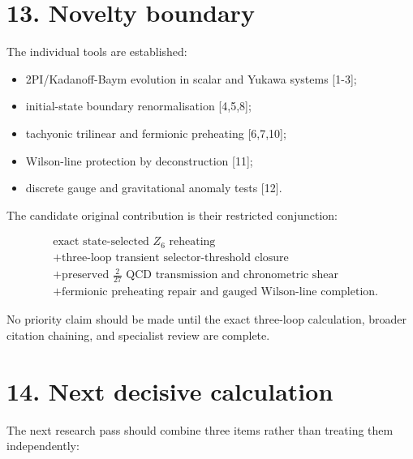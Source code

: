 \documentclass[
  10pt,
]{article}
\providecommand{\tightlist}{%
  \setlength{\itemsep}{0pt}\setlength{\parskip}{0pt}}
\begin{document}
\section{13. Novelty boundary}\label{novelty-boundary}

The individual tools are established:

\begin{itemize}
\tightlist
\item
  2PI/Kadanoff-Baym evolution in scalar and Yukawa systems {[}1-3{]};
\item
  initial-state boundary renormalisation {[}4,5,8{]};
\item
  tachyonic trilinear and fermionic preheating {[}6,7,10{]};
\item
  Wilson-line protection by deconstruction {[}11{]};
\item
  discrete gauge and gravitational anomaly tests {[}12{]}.
\end{itemize}

The candidate original contribution is their restricted conjunction:

\[
\boxed{
\begin{aligned}
&\text{exact state-selected }Z_6\text{ reheating}\\
&+\text{three-loop transient selector-threshold closure}\\
&+\text{preserved }\frac{2}{27}\text{ QCD transmission and chronometric shear}\\
&+\text{fermionic preheating repair and gauged Wilson-line completion}.
\end{aligned}}
\]

No priority claim should be made until the exact three-loop calculation,
broader citation chaining, and specialist review are complete.

\section{14. Next decisive calculation}\label{next-decisive-calculation}

The next research pass should combine three items rather than treating
them independently:
\end{document}
